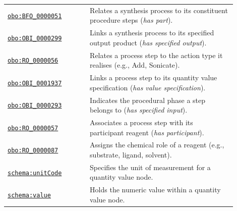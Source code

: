 \begin{table}[htbp]
\begin{tabular}{p{0.32\linewidth}p{0.58\linewidth}}
    \href{http://purl.obolibrary.org/obo/BFO_0000051}{\texttt{obo:BFO\_0000051}} & Relates a synthesis process to its constituent procedure steps (\textit{has part}). \\
    \href{http://purl.obolibrary.org/obo/OBI_0000299}{\texttt{obo:OBI\_0000299}} & Links a synthesis process to its specified output product (\textit{has specified output}). \\
    \href{http://purl.obolibrary.org/obo/RO_0000056}{\texttt{obo:RO\_0000056}} & Relates a process step to the action type it realises (e.g., Add, Sonicate). \\
    \href{http://purl.obolibrary.org/obo/OBI_0001937}{\texttt{obo:OBI\_0001937}} & Links a process step to its quantity value specification (\textit{has value specification}). \\
    \href{http://purl.obolibrary.org/obo/OBI_0000293}{\texttt{obo:OBI\_0000293}} & Indicates the procedural phase a step belongs to (\textit{has specified input}). \\
    \href{http://purl.obolibrary.org/obo/RO_0000057}{\texttt{obo:RO\_0000057}} & Associates a process step with its participant reagent (\textit{has participant}). \\
    \href{http://purl.obolibrary.org/obo/RO_0000087}{\texttt{obo:RO\_0000087}} & Assigns the chemical role of a reagent (e.g., substrate, ligand, solvent). \\
    \href{https://schema.org/unitCode}{\texttt{schema:unitCode}} & Specifies the unit of measurement for a quantity value node. \\
    \href{https://schema.org/value}{\texttt{schema:value}} & Holds the numeric value within a quantity value node. \\
    \hline
  \end{tabular}
\end{table}


